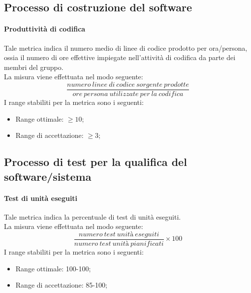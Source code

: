 				\subsection[Processo di costruzione del software]{\hypertarget{pcs}{Processo di costruzione del software}}
				
			\paragraph[Produttività di codifica]{\hypertarget{pc}{Produttività di codifica}}
			Tale metrica indica il numero medio di linee di codice prodotto per ora/persona, ossia il numero di ore effettive impiegate nell'attività di codifica da parte dei membri del gruppo.
			\\La misura viene effettuata nel modo seguente:
				\begin{equation}
					\frac{numero~linee~di~codice~sorgente~prodotte}{ore~persona~utilizzate~per~la~codifica}
				\end{equation}
			I range stabiliti per la metrica sono i seguenti:
			\begin{itemize}
					\item Range ottimale: $\geq{10}$;
					\item Range di accettazione: $\geq{3}$;
				\end{itemize}
				
				\subsection[Processo di test per la qualifica del software/sistema]{\hypertarget{ptqs}{Processo di test per la qualifica del software/sistema}}
				
			\paragraph[Test di unità eseguiti]{\hypertarget{tue}{Test di unità eseguiti}}
			Tale metrica indica la percentuale di test di unità eseguiti.
			\\La misura viene effettuata nel modo seguente:
				\begin{equation}
					\frac{numero~test~unità~eseguiti}{numero~test~unità~pianificati}\times100
				\end{equation}
			I range stabiliti per la metrica sono i seguenti:
			\begin{itemize}
					\item Range ottimale: 100-100;
					\item Range di accettazione: 85-100;
				\end{itemize}
				
